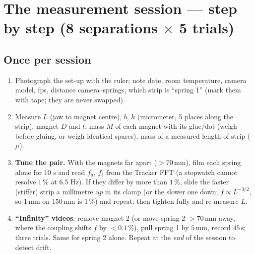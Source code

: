 \documentclass[11pt,a4paper]{article}
\newcommand{\un}[1]{\,\mathrm{#1}}
\begin{document}
\section{The measurement session --- step by step (8 separations $\times$ 5 trials)}

\subsection*{Once per session}
\begin{enumerate}[leftmargin=1.6em,itemsep=1pt]
\item Photograph the set-up with the ruler; note date, room temperature, camera model, fps, distance camera--springs, which strip is ``spring 1'' (mark them with tape; they are never swapped).
\item Measure $L$ (jaw to magnet centre), $b$, $h$ (micrometer, 5 places along the strip), magnet $D$ and $t$, mass $M$ of each magnet with its glue/dot (weigh before gluing, or weigh identical spares), mass of a measured length of strip ($\mu$).
\item \textbf{Tune the pair.} With the magnets far apart ($>70\un{mm}$), film each spring alone for 10 s and read $f_a$, $f_b$ from the Tracker FFT (a stopwatch cannot resolve $1\,\%$ at 6.5 Hz). If they differ by more than $1\,\%$, slide the faster (stiffer) strip a millimetre \emph{up} in its clamp (or the slower one down; $f\propto L^{-3/2}$, so $1\un{mm}$ on $150\un{mm}$ is $1\,\%$) and repeat; then tighten fully and re-measure $L$.
\item \textbf{``Infinity'' videos}: remove magnet 2 (or move spring 2 $>70\un{mm}$ away, where the coupling shifts $f$ by $<0.1\,\%$), pull spring 1 by $5\un{mm}$, record $45\un{s}$; three trials. Same for spring 2 alone. Repeat at the \emph{end} of the session to detect drift.
\end{enumerate}
\end{document}

